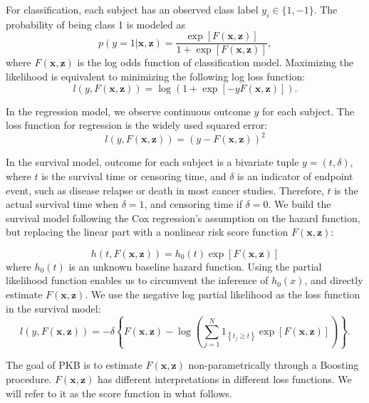 \documentclass[a4paper,12pt]{article}
\newcommand{\bd}[1]{\mathbf{#1}}
\begin{document}
	For classification, each subject has an observed class label $y_i \in \{1,-1\}$. The probability of being class 1 is modeled as 
	$$p(y = 1| \bd{x}, \bd{z}) = \frac{\exp[F(\bd{x}, \bd{z})]}{1 + \exp[F(\bd{x}, \bd{z})]},$$
	where $F(\bd{x}, \bd{z})$ is the log odds function of classification model. Maximizing the likelihood is equivalent to minimizing the following log loss function:\cite{zeng2019pathway}
	$$l(y , F(\bd{x}, \bd{z}) ) = \log(1+\exp[-y F(\bd{x}, \bd{z})]).$$
	
	In the regression model, we observe continuous outcome $y$ for each subject. The loss function for regression is the widely used squared error:
	$$l(y , F(\bd{x}, \bd{z}) ) = ( y - F(\bd{x}, \bd{z}))^2$$
	
	In the survival model, outcome for each subject is a bivariate tuple $y = (t, \delta)$, where $t$ is the survival time or censoring time, and $\delta$ is an indicator of endpoint event, such as disease relapse or death in most cancer studies. Therefore, $t$ is the actual survival time when $\delta = 1$, and censoring time if $\delta = 0$. We build the survival model following the Cox regression's assumption on the hazard function, but replacing the linear part with a nonlinear risk score function $F(\bd{x}, \bd{z})$: \cite{li2005boosting}

	\begin{equation}
	\label{eqn:hazard}
	h(t, F(\bd{x},\bd{z}) ) = h_0(t)\exp[F(\bd{x},\bd{z})]
	\end{equation}
	where $h_0(t)$ is an unknown baseline hazard function. Using the partial likelihood function enables us to circumvent the inference of $h_0(x)$, and directly estimate $F(\bd{x}, \bd{z})$. We use the negative log partial likelihood\cite{li2005boosting} as the loss function in the survival model:
	$$l(y, F(\bd{x}, \bd{z}) ) = -\delta \left\lbrace F(\bd{x}, \bd{z}) - \log\left( \sum^{N}_{j=1}1_{\left\lbrace t_j \geq t\right\rbrace }\exp[F(\bd{x}, \bd{z})]\right)  \right\rbrace.$$
	
	The goal of PKB is to estimate $F(\bd{x}, \bd{z})$ non-parametrically through a Boosting procedure. $F(\bd{x}, \bd{z})$ has different interpretations in different loss functions. We will refer to it as the score function in what follows.
\end{document}
